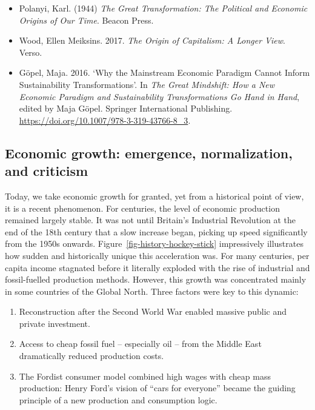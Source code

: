 \documentclass[
  a4paper,
  DIV=11,
  numbers=noendperiod,
  oneside,
  openany]{scrreprt}
\providecommand{\tightlist}{%
  \setlength{\itemsep}{0pt}\setlength{\parskip}{0pt}}
\begin{document}
\begin{tcolorbox}[enhanced jigsaw, arc=.35mm, bottomrule=.15mm, bottomtitle=1mm, breakable, colback=white, colbacktitle=quarto-callout-caution-color!10!white, colframe=quarto-callout-caution-color-frame, coltitle=black, left=2mm, leftrule=.75mm, opacityback=0, opacitybacktitle=0.6, rightrule=.15mm, title={Further reading}, titlerule=0mm, toprule=.15mm, toptitle=1mm]

\begin{itemize}
\item
  Polanyi, Karl. (1944) \emph{The Great Transformation: The Political
  and Economic Origins of Our Time}. Beacon Press.
\item
  Wood, Ellen Meiksins. 2017. \emph{The Origin of Capitalism: A Longer
  View}. Verso.
\item
  Göpel, Maja. 2016. `Why the Mainstream Economic Paradigm Cannot Inform
  Sustainability Transformations'. In \emph{The Great Mindshift: How a
  New Economic Paradigm and Sustainability Transformations Go Hand in
  Hand}, edited by Maja Göpel. Springer International Publishing.
  \url{https://doi.org/10.1007/978-3-319-43766-8_3}.
\end{itemize}

\end{tcolorbox}

\subsection{Economic growth: emergence, normalization, and
criticism}\label{economic-growth-emergence-normalization-and-criticism}

Today, we take economic growth for granted, yet from a historical point
of view, it is a recent phenomenon. For centuries, the level of economic
production remained largely stable. It was not until Britain's
Industrial Revolution at the end of the 18th century that a slow
increase began, picking up speed significantly from the 1950s onwards.
Figure~\ref{fig-history-hockey-stick} impressively illustrates how
sudden and historically unique this acceleration was. For many
centuries, per capita income stagnated before it literally exploded with
the rise of industrial and fossil-fuelled production methods. However,
this growth was concentrated mainly in some countries of the Global
North. Three factors were key to this dynamic:

\begin{enumerate}
\def\labelenumi{\arabic{enumi}.}
\tightlist
\item
  Reconstruction after the Second World War enabled massive public and
  private investment.
\item
  Access to cheap fossil fuel -- especially oil -- from the Middle East
  dramatically reduced production costs.
\item
  The Fordist consumer model combined high wages with cheap mass
  production: Henry Ford's vision of ``cars for everyone'' became the
  guiding principle of a new production and consumption logic.
\end{enumerate}
\end{document}
